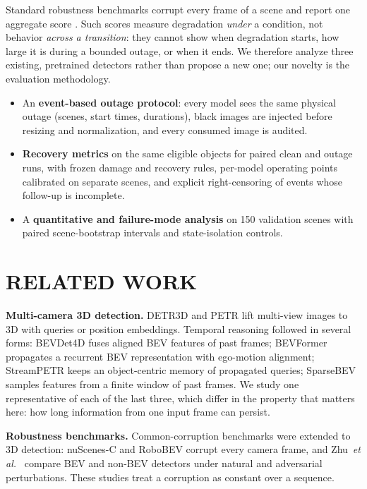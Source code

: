 \documentclass[letterpaper, 10 pt, conference]{ieeeconf}
\begin{document}
Standard robustness benchmarks corrupt every frame of a scene and report one aggregate score \cite{dong2023,xie2023,zhu2023}.
Such scores measure degradation \emph{under} a condition, not behavior \emph{across a transition}: they cannot show when degradation starts, how large it is
during a bounded outage, or when it ends. We therefore analyze three existing, pretrained detectors rather than propose a new one; our novelty is the evaluation methodology.
\begin{itemize}
\item An \textbf{event-based outage protocol}: every model sees the same physical outage (scenes, start times, durations), black
images are injected before resizing and normalization, and every consumed image is audited.
\item \textbf{Recovery metrics} on the same eligible objects for paired clean and outage runs, with frozen damage and recovery rules, per-model
operating points calibrated on separate scenes, and explicit right-censoring of events whose follow-up is incomplete.
\item A \textbf{quantitative and failure-mode analysis} on 150 validation scenes with paired scene-bootstrap intervals and state-isolation controls.
\end{itemize}

\section{RELATED WORK}

\textbf{Multi-camera 3D detection.} DETR3D \cite{detr3d} and PETR \cite{petr} lift multi-view images to 3D with queries or position embeddings.
Temporal reasoning followed in several forms: BEVDet4D \cite{bevdet4d} fuses aligned BEV features of past frames; BEVFormer \cite{bevformer} propagates a recurrent BEV
representation with ego-motion alignment; StreamPETR \cite{streampetr} keeps an object-centric memory of propagated queries; SparseBEV \cite{sparsebev} samples features from
a finite window of past frames. We study one representative of each of the last three, which differ in the property that matters here:
how long information from one input frame can persist.

\textbf{Robustness benchmarks.} Common-corruption benchmarks \cite{hendrycks2019} were extended to 3D detection: nuScenes-C \cite{dong2023} and RoboBEV \cite{xie2023}
corrupt every camera frame, and Zhu~\emph{et al.}~\cite{zhu2023} compare BEV and non-BEV detectors under natural and adversarial perturbations. These studies treat a corruption as constant over a sequence.
\end{document}
